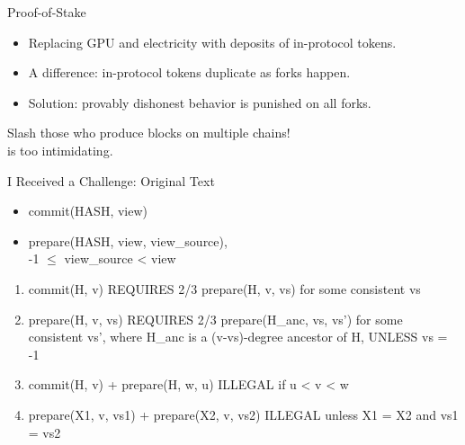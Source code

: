\documentclass{beamer}
\begin{document}
\begin{frame}{Proof-of-Stake}

\begin{itemize}
\item Replacing GPU and electricity with deposits of in-protocol tokens.
\item A difference: in-protocol tokens duplicate as forks happen.
\item Solution: provably dishonest behavior is punished on all forks.
\end{itemize}

\alert{Slash those who produce blocks on multiple chains!}\\ is too intimidating.
\end{frame}


\begin{frame}{I Received a Challenge: Original Text}


  \begin{itemize}
  \item commit(HASH, view)
  \item prepare(HASH, view, view\_source),\\ -1 $\le$ view\_source < view
  \end{itemize}


  \begin{enumerate}
    \item commit(H, v) REQUIRES 2/3 prepare(H, v, vs) for some consistent vs
    \item prepare(H, v, vs) REQUIRES 2/3 prepare(H\_anc, vs, vs') for some consistent vs', where H\_anc is a (v-vs)-degree ancestor of H, UNLESS vs = -1
    \item commit(H, v) + prepare(H, w, u) ILLEGAL if u < v < w
    \item prepare(X1, v, vs1) + prepare(X2, v, vs2) ILLEGAL unless X1 = X2 and vs1 = vs2
  \end{enumerate}

\end{frame}
\end{document}
